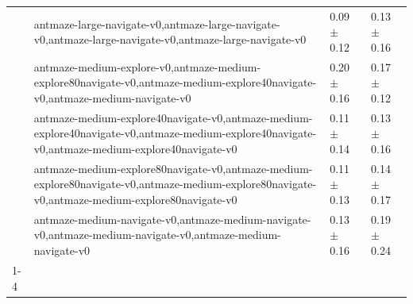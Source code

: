 \begin{tabular}{llll}
 & antmaze-large-navigate-v0,antmaze-large-navigate-v0,antmaze-large-navigate-v0,antmaze-large-navigate-v0 & 0.09 $\pm$ 0.12 & 0.13 $\pm$ 0.16 \\
 & antmaze-medium-explore-v0,antmaze-medium-explore80navigate-v0,antmaze-medium-explore40navigate-v0,antmaze-medium-navigate-v0 & 0.20 $\pm$ 0.16 & 0.17 $\pm$ 0.12 \\
 & antmaze-medium-explore40navigate-v0,antmaze-medium-explore40navigate-v0,antmaze-medium-explore40navigate-v0,antmaze-medium-explore40navigate-v0 & 0.11 $\pm$ 0.14 & 0.13 $\pm$ 0.16 \\
 & antmaze-medium-explore80navigate-v0,antmaze-medium-explore80navigate-v0,antmaze-medium-explore80navigate-v0,antmaze-medium-explore80navigate-v0 & 0.11 $\pm$ 0.13 & 0.14 $\pm$ 0.17 \\
 & antmaze-medium-navigate-v0,antmaze-medium-navigate-v0,antmaze-medium-navigate-v0,antmaze-medium-navigate-v0 & 0.13 $\pm$ 0.16 & 0.19 $\pm$ 0.24 \\
\cline{1-4}
\bottomrule
\end{tabular}
